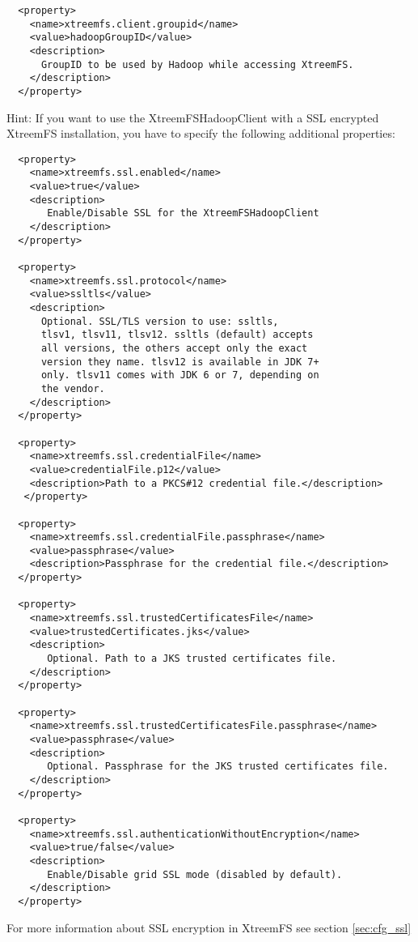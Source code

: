 \documentclass[a4paper,10pt]{book}
\begin{document}
\begin{enumerate}
\begin{enumerate}
\begin{verbatim}
  <property>
    <name>xtreemfs.client.groupid</name>
    <value>hadoopGroupID</value>
    <description>
      GroupID to be used by Hadoop while accessing XtreemFS.
    </description>
  </property>
	\end{verbatim}

		Hint: If you want to use the XtreemFSHadoopClient with a SSL encrypted XtreemFS installation, you have to specify the following additional properties:
	\begin{verbatim}
  <property>
    <name>xtreemfs.ssl.enabled</name>
    <value>true</value>
    <description>
       Enable/Disable SSL for the XtreemFSHadoopClient
    </description>
  </property>

  <property>
    <name>xtreemfs.ssl.protocol</name>
    <value>ssltls</value>
    <description>
      Optional. SSL/TLS version to use: ssltls,
      tlsv1, tlsv11, tlsv12. ssltls (default) accepts
      all versions, the others accept only the exact
      version they name. tlsv12 is available in JDK 7+
      only. tlsv11 comes with JDK 6 or 7, depending on
      the vendor.
    </description>
  </property>

  <property>
    <name>xtreemfs.ssl.credentialFile</name>
    <value>credentialFile.p12</value>
    <description>Path to a PKCS#12 credential file.</description>
   </property>

  <property>
    <name>xtreemfs.ssl.credentialFile.passphrase</name>
    <value>passphrase</value>
    <description>Passphrase for the credential file.</description>
  </property>

  <property>
    <name>xtreemfs.ssl.trustedCertificatesFile</name>
    <value>trustedCertificates.jks</value>
    <description>
       Optional. Path to a JKS trusted certificates file.
    </description>
  </property>

  <property>
    <name>xtreemfs.ssl.trustedCertificatesFile.passphrase</name>
    <value>passphrase</value>
    <description>
       Optional. Passphrase for the JKS trusted certificates file.
    </description>
  </property>

  <property>
    <name>xtreemfs.ssl.authenticationWithoutEncryption</name>
    <value>true/false</value>
    <description>
       Enable/Disable grid SSL mode (disabled by default).
    </description>
  </property>
	\end{verbatim}

  For more information about SSL encryption in XtreemFS see section \ref{sec:cfg_ssl}


\end{enumerate}
\end{enumerate}
\end{document}
